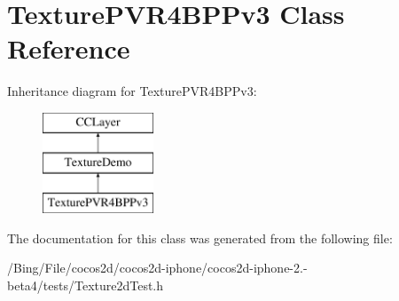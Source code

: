 \hypertarget{interface_texture_p_v_r4_b_p_pv3}{\section{Texture\-P\-V\-R4\-B\-P\-Pv3 Class Reference}
\label{interface_texture_p_v_r4_b_p_pv3}
}
Inheritance diagram for Texture\-P\-V\-R4\-B\-P\-Pv3\-:\begin{figure}[H]
\begin{center}
\leavevmode
\includegraphics[height=3.000000cm]{interface_texture_p_v_r4_b_p_pv3}
\end{center}
\end{figure}


The documentation for this class was generated from the following file\-:\begin{DoxyCompactItemize}
\item 
/\-Bing/\-File/cocos2d/cocos2d-\/iphone/cocos2d-\/iphone-\/2.-\/beta4/tests/Texture2d\-Test.\-h\end{DoxyCompactItemize}
